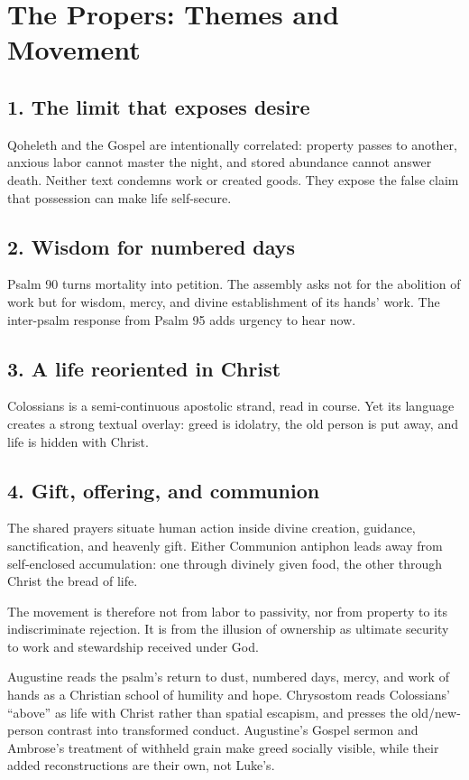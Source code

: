 \label{triptych:brief-synthesis:start}
\section*{The Propers: Themes and Movement}
\subsection*{1. The limit that exposes desire}
Qoheleth and the Gospel are intentionally correlated: property passes to
another, anxious labor cannot master the night, and stored abundance cannot
answer death. Neither text condemns work or created goods. They expose the
false claim that possession can make life self-secure.
\subsection*{2. Wisdom for numbered days}
Psalm 90 turns mortality into petition. The assembly asks not for the
abolition of work but for wisdom, mercy, and divine establishment of its
hands' work. The inter-psalm response from Psalm 95 adds urgency to hear now.
\subsection*{3. A life reoriented in Christ}
Colossians is a semi-continuous apostolic strand, read in course. Yet its language creates a strong textual overlay:
greed is idolatry, the old person is put away, and life is hidden with Christ.
\subsection*{4. Gift, offering, and communion}
The shared prayers situate human action inside divine creation, guidance,
sanctification, and heavenly gift. Either Communion antiphon leads away from
self-enclosed accumulation: one through divinely given food, the other through
Christ the bread of life.

\clearpage
The movement is therefore not from labor to passivity, nor from property to
its indiscriminate rejection. It is from the illusion of ownership as
ultimate security to work and stewardship received under God.

Augustine reads the psalm's return to dust, numbered days, mercy, and work of
hands as a Christian school of humility and hope. Chrysostom reads Colossians'
``above'' as life with Christ rather than spatial escapism, and presses the
old/new-person contrast into transformed conduct. Augustine's Gospel sermon
and Ambrose's treatment of withheld grain make greed socially visible, while their added reconstructions are their own, not Luke's.

